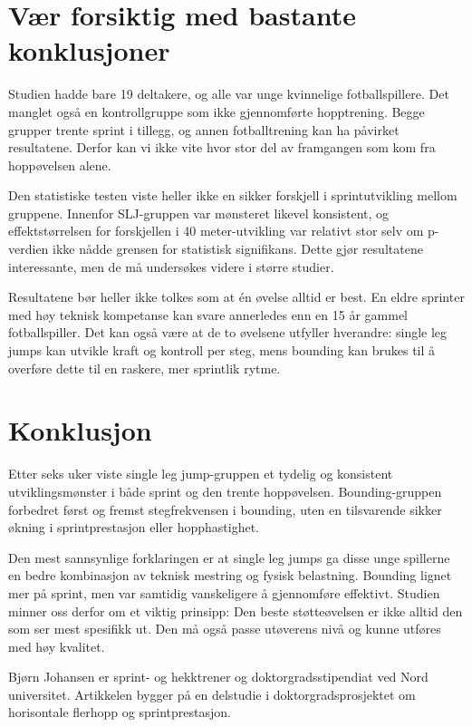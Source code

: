 \section{Vær forsiktig med bastante konklusjoner}\label{vuxe6r-forsiktig-med-bastante-konklusjoner}

Studien hadde bare 19 deltakere, og alle var unge kvinnelige fotballspillere. Det manglet også en kontrollgruppe som ikke gjennomførte hopptrening. Begge grupper trente sprint i tillegg, og annen fotballtrening kan ha påvirket resultatene. Derfor kan vi ikke vite hvor stor del av framgangen som kom fra hoppøvelsen alene.

Den statistiske testen viste heller ikke en sikker forskjell i sprintutvikling mellom gruppene. Innenfor SLJ-gruppen var mønsteret likevel konsistent, og effektstørrelsen for forskjellen i 40 meter-utvikling var relativt stor selv om p-verdien ikke nådde grensen for statistisk signifikans. Dette gjør resultatene interessante, men de må undersøkes videre i større studier.

Resultatene bør heller ikke tolkes som at én øvelse alltid er best. En eldre sprinter med høy teknisk kompetanse kan svare annerledes enn en 15 år gammel fotballspiller. Det kan også være at de to øvelsene utfyller hverandre: single leg jumps kan utvikle kraft og kontroll per steg, mens bounding kan brukes til å overføre dette til en raskere, mer sprintlik rytme.

\section{Konklusjon}\label{konklusjon}

Etter seks uker viste single leg jump-gruppen et tydelig og konsistent utviklingsmønster i både sprint og den trente hoppøvelsen. Bounding-gruppen forbedret først og fremst stegfrekvensen i bounding, uten en tilsvarende sikker økning i sprintprestasjon eller hopphastighet.

Den mest sannsynlige forklaringen er at single leg jumps ga disse unge spillerne en bedre kombinasjon av teknisk mestring og fysisk belastning. Bounding lignet mer på sprint, men var samtidig vanskeligere å gjennomføre effektivt. Studien minner oss derfor om et viktig prinsipp: Den beste støtteøvelsen er ikke alltid den som ser mest spesifikk ut. Den må også passe utøverens nivå og kunne utføres med høy kvalitet. \sluttmerke

\begin{forfatterboks}

Bjørn Johansen er sprint- og hekktrener og doktorgradsstipendiat ved Nord universitet. Artikkelen bygger på en delstudie i doktorgradsprosjektet om horisontale flerhopp og sprintprestasjon.

\end{forfatterboks}

